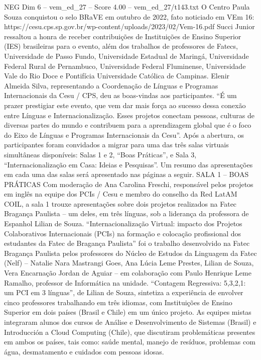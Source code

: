 \begin{textsample}{NEG Dim 6 – vem\_ed\_27 – Score 4.00 – vem\_ed\_27/t143.txt}
O Centro Paula Souza conquistou o selo BRaVE em outubro de 2022, fato noticiado em VEm 16: https://cesu.cps.sp.gov.br/wp-content/uploads/2023/02/Vem-16.pdf Succi Junior ressaltou a honra de receber contribuições de Instituições de Ensino Superior (IES) brasileiras para o evento, além dos trabalhos de professores de Fatecs, Universidade de Passo Fundo, Universidade Estadual de Maringá, Universidade Federal Rural de Pernambuco, Universidade Federal Fluminense, Universidade Vale do Rio Doce e Pontifícia Universidade Católica de Campinas.
Elenir Almeida Silva, representando a Coordenação de Línguas e Programas Internacionais da Cesu / CPS, deu as boas-vindas aos participantes. “É um prazer prestigiar este evento, que vem dar mais força ao sucesso dessa conexão entre Línguas e Internacionalização.
Esses projetos conectam pessoas, culturas de diversas partes do mundo e contribuem para a aprendizagem global que é o foco do Eixo de Línguas e Programas Internacionais da Cesu”.
Após a abertura, os participantes foram convidados a migrar para uma das três salas virtuais simultâneas disponíveis: Salas 1 e 2, “Boas Práticas”, e Sala 3, “Internacionalização em Casa: Ideias e Pesquisas”.
Um resumo das apresentações em cada uma das salas será apresentado nas páginas a seguir.
SALA 1 – BOAS PRÁTICAS Com moderação de Ana Carolina Freschi, responsável pelos projetos em inglês na equipe dos PCIs / Cesu e membro do conselho da Red LatAM COIL, a sala 1 trouxe apresentações sobre dois projetos realizados na Fatec Bragança Paulista – um deles, em três línguas, sob a liderança da professora de Espanhol Lilian de Souza. “Internacionalização Virtual: impacto dos Projetos Colaborativos Internacionais (PCIs) na formação e colocação profissional dos estudantes da Fatec de Bragança Paulista” foi o trabalho desenvolvido na Fatec Bragança Paulista pelos professores do Núcleo de Estudos da Linguagem da Fatec (Nelf) – Natalie Nara Mastrangi Goes, Ana Lúcia Leme Prestes, Lilian de Souza, Vera Encarnação Jordan de Aguiar – em colaboração com Paulo Henrique Leme Ramalho, professor de Informática na unidade. “Contagem Regressiva: 5,3,2,1: um PCI em 3 línguas”, de Lilian de Souza, sintetiza a experiência de envolver cinco professores trabalhando em três idiomas, com Instituições de Ensino Superior em dois países (Brasil e Chile) em um único projeto.
As equipes mistas integraram alunos dos cursos de Análise e Desenvolvimento de Sistemas (Brasil) e Introducción a Cloud Computing (Chile), que discutiram problemáticas presentes em ambos os países, tais como: saúde mental, manejo de resíduos, problemas com água, desmatamento e cuidados com pessoas idosas.

\end{textsample}
